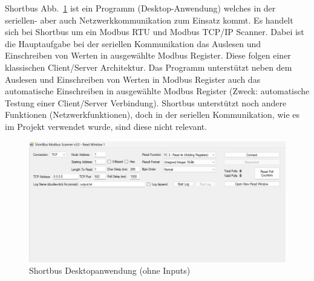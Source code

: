 Shortbus Abb.~\ref{fig:Shortbusfenster} ist ein Programm (Desktop-Anwendung) welches in der seriellen- aber auch Netzwerkkommunikation zum Einsatz kommt. 
Es handelt sich bei Shortbus um ein Modbus RTU und Modbus TCP/IP Scanner.
Dabei ist die Hauptaufgabe bei der seriellen Kommunikation das Auslesen und Einschreiben von Werten in ausgewählte Modbus Register. Diese folgen einer klassischen Client/Server Architektur.
Das Programm unterstützt neben dem Auslesen und Einschreiben von Werten in Modbus Register auch das  automatische Einschreiben in ausgewählte Modbus Register (Zweck: automatische Testung einer Client/Server Verbindung).
Shortbus unterstützt noch andere Funktionen (Netzwerkfunktionen), doch in der seriellen Kommunikation, wie es im Projekt verwendet wurde, sind diese nicht relevant.
\cite[vgl.][]{software.informer:2024}

\begin{figure}[H]
	\centering
	\includegraphics[width=1\linewidth]{Bilder/shortbus_fenster}
	\caption{Shortbus Desktopanwendung (ohne Inputs)} 
	\label{fig:Shortbusfenster}
\end{figure}

